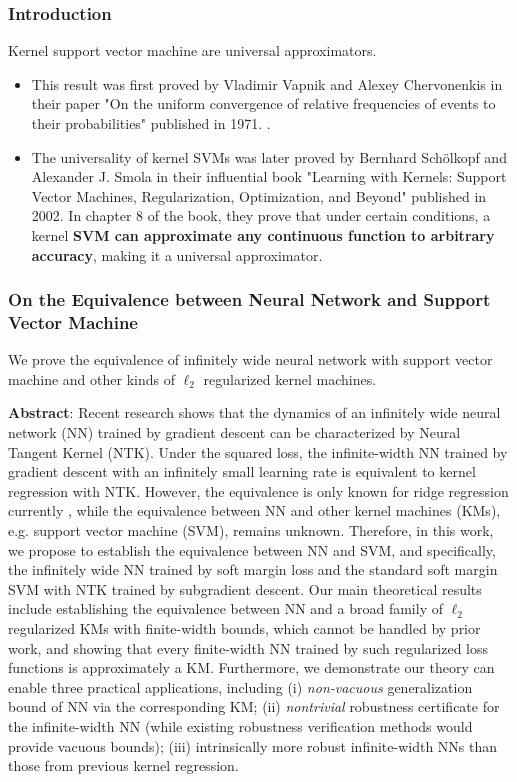 \begin{frame}
  \frametitle{Introduction}

  Kernel support vector machine are universal approximators. 


  \begin{itemize}
    \item This result was first proved by Vladimir Vapnik and Alexey Chervonenkis in their paper "On the uniform convergence of relative frequencies of events to their probabilities" published in 1971. \cite{vapnik1971uniform}.
    \item The universality of kernel SVMs was later proved by Bernhard Schölkopf and Alexander J. Smola in their influential book "Learning with Kernels: Support Vector Machines, Regularization, Optimization, and Beyond" published in 2002. In chapter 8 of the book, they prove that under certain conditions, a kernel \textbf{SVM can approximate any continuous function to arbitrary accuracy}, making it a universal approximator. \cite{schoelkopf2002learning}
  \end{itemize}

\end{frame}

\begin{frame}
  \frametitle{On the Equivalence between Neural Network and Support Vector Machine}
\cite{chen2021on}
We prove the equivalence of infinitely wide neural network with support vector machine and other kinds of $\ell_2$ regularized kernel machines.


  {\tiny
\textbf{Abstract}: Recent research shows that the dynamics of an infinitely wide neural network (NN) trained by gradient descent can be characterized by Neural Tangent Kernel (NTK). Under the squared loss, the infinite-width NN trained by gradient descent with an infinitely small learning rate is equivalent to kernel regression with NTK. However, the equivalence is only known for ridge regression currently , while the equivalence between NN and other kernel machines (KMs), e.g. support vector machine (SVM), remains unknown. Therefore, in this work, we propose to establish the equivalence between NN and SVM, and specifically, the infinitely wide NN trained by soft margin loss and the standard soft margin SVM with NTK trained by subgradient descent. Our main theoretical results include establishing the equivalence between NN and a broad family of $\ell_2$ regularized KMs with finite-width bounds, which cannot be handled by prior work, and showing that every finite-width NN trained by such regularized loss functions is approximately a KM. Furthermore, we demonstrate our theory can enable three practical applications, including (i) \textit{non-vacuous} generalization bound of NN via the corresponding KM; (ii) \textit{nontrivial} robustness certificate for the infinite-width NN (while existing robustness verification methods would provide vacuous bounds); (iii) intrinsically more robust infinite-width NNs than those from previous kernel regression.
  }
\end{frame}

